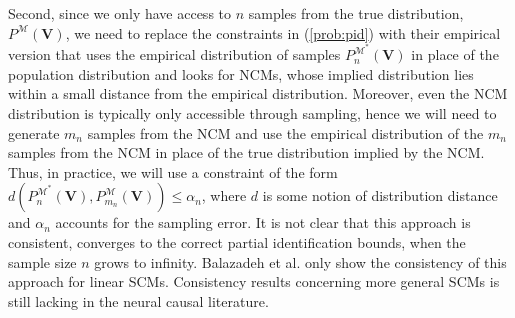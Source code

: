 \documentclass[12pt]{article}
\theoremstyle{plain}
\theoremstyle{definition}
\theoremstyle{remark}
\begin{document}
Second, since we only have access to $n$ samples from the true distribution, $P^{\mathcal{M}}(\boldsymbol{V})$, we need to replace the constraints in (\ref{prob:pid}) with their empirical version that uses the empirical distribution of samples $P_n^{\mathcal{M^*}}(\boldsymbol{V})$ in place of the population distribution and looks for NCMs, whose implied distribution lies within a small distance from the empirical distribution. Moreover, even the NCM distribution is typically only accessible through sampling, hence we will need to generate $m_n$ samples from the NCM and use the empirical distribution of the $m_n$ samples from the NCM in place of the true distribution implied by the NCM. Thus, in practice, we will use a constraint of the form $d(P_n^{\mathcal{M^*}}(\boldsymbol{V}),P_{m_n}^{\mathcal{M}}(\boldsymbol{V})) \leqslant \alpha_n$, where $d$ is some notion of distribution distance and $\alpha_n$ accounts for the sampling error. It is not clear that this approach is consistent, converges to the correct partial identification bounds, when the sample size $n$ grows to infinity.  Balazadeh et al. \cite{balazadehPartialIdentificationTreatment2022} only show the consistency of this approach for linear SCMs. Consistency results concerning more general SCMs is still lacking in the neural causal literature.\par 
\end{document}
